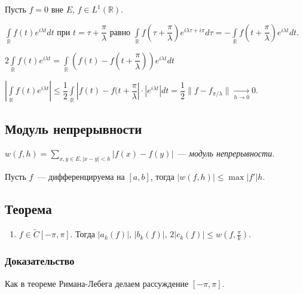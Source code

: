\documentclass{article}
\begin{document}
            Пусть $f = 0$ вне $E$, $f \in L^1 (\mathbb{R})$.
            
            $\int\limits_{\mathbb{R}} f(t) e^{i \lambda t} dt$ при $t = \tau + \dfrac{\pi}{\lambda}$ равно $\int\limits_{\mathbb{R}} f \left( \tau + \dfrac{\pi}{\lambda} \right) e^{i \lambda \tau + i \pi} d \tau = - \int\limits_{\mathbb{R}} f \left( t + \dfrac{\pi}{\lambda} \right) e^{i \lambda t} dt$.
            
            $2 \int\limits_{\mathbb{R}} f(t) e^{i \lambda t} = \int\limits_{\mathbb{R}} \left( f(t) - f(t + \dfrac{\pi}{\lambda}) \right) e^{i \lambda t} dt$
            
            $\left| \int\limits_{\mathbb{R}} f(t) e^{i \lambda t} \right| \leqslant \dfrac{1}{2} \int\limits_{\mathbb{R}} \left| f(t) - f(t + \dfrac{\pi}{\lambda} \right| \cdot \left| e^{i \lambda t} \right| dt = \dfrac{1}{2} \| f - f_{\pi / \lambda} \| \xrightarrow[h \rightarrow 0]{} 0$.
    
    \newpage
    
    \subsection{Модуль непрерывности}
    
        $w(f, h) = \sum\limits_{x, y \in E, |x - y| < h} | f(x) - f(y) |$~--- \textit{модуль непрерывности}.
        
    Пусть $f$~--- дифференцируема на $[a, b]$, тогда $| w(f, h)| \leqslant \max |f'| h$.
    
    \subsection{Теорема}
    
        \begin{enumerate}
        
            \item $f \in \widetilde{C} [-\pi, \pi]$. Тогда $|a_k(f)|$, $|b_k(f)|$, $2|c_k(f)| \leqslant w(f, \frac{\pi}{k})$.
            
        \end{enumerate}
        
        \subsubsection{Доказательство}
        
            Как в теореме Римана-Лебега делаем рассуждение $[-\pi, \pi]$.
            
\end{document}
